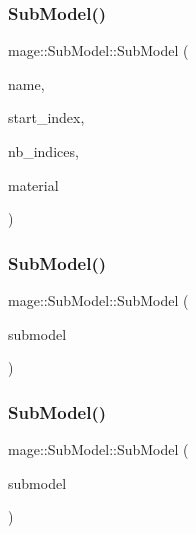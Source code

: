 \subsubsection{\texorpdfstring{Sub\+Model()}{SubModel()}\hspace{0.1cm}{\footnotesize\ttfamily [1/3]}}
{\footnotesize\ttfamily mage\+::\+Sub\+Model\+::\+Sub\+Model (\begin{DoxyParamCaption}\item[{const string \&}]{name,  }\item[{size\+\_\+t}]{start\+\_\+index,  }\item[{size\+\_\+t}]{nb\+\_\+indices,  }\item[{const \hyperlink{structmage_1_1_shaded_material}{Shaded\+Material} \&}]{material }\end{DoxyParamCaption})}

\hypertarget{classmage_1_1_sub_model_ae71dcb72fc1b06710b390c97a2db1d68}{}\label{classmage_1_1_sub_model_ae71dcb72fc1b06710b390c97a2db1d68} 
\subsubsection{\texorpdfstring{Sub\+Model()}{SubModel()}\hspace{0.1cm}{\footnotesize\ttfamily [2/3]}}
{\footnotesize\ttfamily mage\+::\+Sub\+Model\+::\+Sub\+Model (\begin{DoxyParamCaption}\item[{const \hyperlink{classmage_1_1_sub_model}{Sub\+Model} \&}]{submodel }\end{DoxyParamCaption})}

\hypertarget{classmage_1_1_sub_model_a3813e71a2904ee9edf3e3788d96eb2c7}{}\label{classmage_1_1_sub_model_a3813e71a2904ee9edf3e3788d96eb2c7} 
\subsubsection{\texorpdfstring{Sub\+Model()}{SubModel()}\hspace{0.1cm}{\footnotesize\ttfamily [3/3]}}
{\footnotesize\ttfamily mage\+::\+Sub\+Model\+::\+Sub\+Model (\begin{DoxyParamCaption}\item[{\hyperlink{classmage_1_1_sub_model}{Sub\+Model} \&\&}]{submodel }\end{DoxyParamCaption})}


